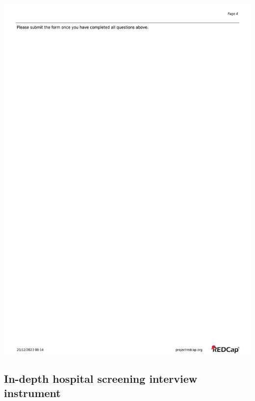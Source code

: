 \documentclass[
]{scrartcl}
\begin{document}
\includegraphics{./appendices/hospital-screening-instrument/hospital-screening-instrument-4.pdf}

\hypertarget{sec-appendix-hospital-screening-interview-instrument}{%
\subsection{In-depth hospital screening interview
instrument}\label{sec-appendix-hospital-screening-interview-instrument}}
\end{document}
